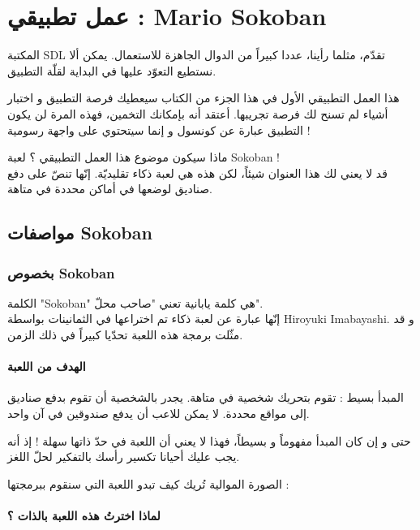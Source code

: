 \chapter{عمل تطبيقي : \textenglish{Mario Sokoban}}

المكتبة
\textenglish{SDL}
تقدّم، مثلما رأينا، عددا كبيراً من الدوال الجاهزة للاستعمال. يمكن ألا نستطيع التعوّد عليها في البداية لقلّة التطبيق.

هذا العمل التطبيقي الأول في هذا الجزء من الكتاب سيعطيك فرصة التطبيق و اختبار أشياء لم تسنح لك فرصة تجريبها.
أعتقد أنه بإمكانك التخمين، فهذه المرة لن يكون التطبيق عبارة عن كونسول و إنما سيتحتوي على واجهة رسومية !

ماذا سيكون موضوع هذا العمل التطبيقي ؟ لعبة
\textenglish{Sokoban} !\\
قد لا يعني لك هذا العنوان شيئاً، لكن هذه هي لعبة ذكاء تقليديّة. إنّها تنصّ على دفع صناديق لوضعها في أماكن محددة في متاهة.

\section{مواصفات \textenglish{Sokoban}}

\subsection{بخصوص \textenglish{Sokoban}}

الكلمة
"\textenglish{Sokoban}"
هي كلمة يابانية تعني "صاحب محلّ".\\
إنّها عبارة عن لعبة ذكاء تم اختراعها في الثمانينات بواسطة
\textenglish{Hiroyuki Imabayashi}.
و قد مثّلت برمجة هذه اللعبة تحدّيا كبيراً في ذلك الزمن.

\subsubsection{الهدف من اللعبة}

المبدأ بسيط : تقوم بتحريك شخصية في متاهة. يجدر بالشخصية أن تقوم بدفع صناديق إلى مواقع محددة. لا يمكن للاعب أن يدفع صندوقين في آن واحد.

حتى و إن كان المبدأ مفهوماً و بسيطاً، فهذا لا يعني أن اللعبة في حدّ ذاتها سهلة ! إذ أنه يجب عليك أحيانا تكسير رأسك بالتفكير لحلّ اللغز.

الصورة الموالية تُريك كيف تبدو اللعبة التي سنقوم ببرمجتها :


\subsubsection{لماذا اخترتُ هذه اللعبة بالذات ؟}

